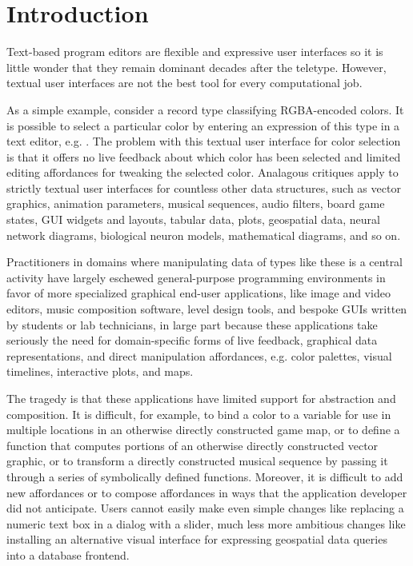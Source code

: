 \section{Introduction}\label{sec:intro}
Text-based program editors are flexible and expressive user interfaces
so it is little wonder that they remain dominant decades after the teletype.
However, textual user interfaces are not the best tool for every computational job.

As a simple example, consider a record type
classifying RGBA-encoded colors. 
It is possible to select a particular color by entering
an expression of this type in a text editor, e.g. . 
The problem with this textual user interface for color selection is that 
it offers no live feedback about which color has been selected 
and limited editing affordances for tweaking the selected color.
Analagous critiques apply to strictly textual user interfaces for 
countless other data structures,
such as vector graphics,
animation parameters,
musical sequences,
audio filters,
board game states, 
GUI widgets and layouts,
tabular data, 
plots,
geospatial data, 
neural network diagrams, 
biological neuron models, 
mathematical diagrams, 
and so on.


Practitioners in domains where manipulating data of types like these is 
a central activity 
have largely eschewed general-purpose programming environments 
in favor of more specialized graphical end-user applications, like %
image and video editors, music composition software, level design tools, 
and bespoke GUIs written by students or lab technicians, 
in large part because these applications 
take seriously the need for domain-specific forms of live feedback, 
graphical data representations, and 
direct manipulation affordances, 
e.g. color palettes, visual timelines, interactive plots, and maps.

The tragedy is that these applications have 
limited support for abstraction and composition.
It is difficult, for example, to bind a
color to a variable for use in multiple locations in an
otherwise directly constructed game map,
or to define a function that computes portions of an 
otherwise directly constructed vector graphic,
or to transform a directly constructed musical sequence 
by passing it through a series of symbolically defined functions.
Moreover, it is difficult to add new affordances or to compose
affordances in ways that the application developer did not anticipate.
Users cannot easily make even simple changes like replacing a numeric text box in a dialog with a slider,
much less more ambitious changes like installing an alternative visual interface for expressing geospatial data queries 
into a database frontend.

